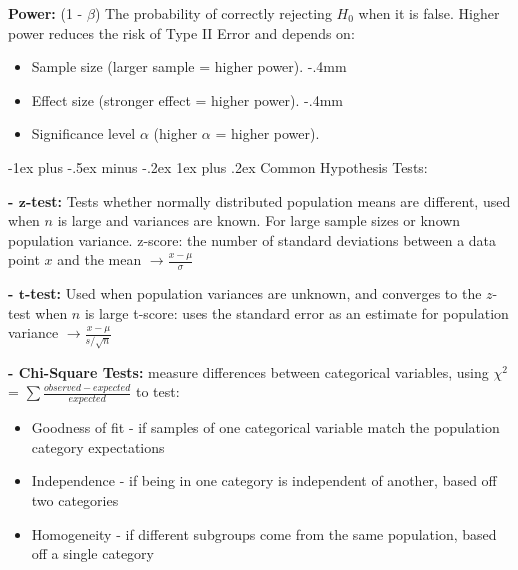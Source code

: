 \documentclass[10pt,landscape]{article}
\makeatletter
\renewcommand{\subsubsection}{\@startsection{subsubsection}{3}{0mm}%
                                {-1ex plus -.5ex minus -.2ex}%
                                {1ex plus .2ex}%
                                {\normalfont\small\bfseries}}
\makeatother
\begin{document}
\begin{multicols}{3}
\textbf{Power:} (1 - $\beta$) The probability of correctly rejecting $H_0$ when it is false. Higher power reduces the risk of Type II Error and depends on:
\begin{itemize}[label={--},leftmargin=4mm]
    \itemsep -.8mm
    \item Sample size (larger sample = higher power).
    \itemsep -.4mm
    \item Effect size (stronger effect = higher power).
    \itemsep -.4mm
    \item Significance level $\alpha$ (higher $\alpha$ = higher power).
\end{itemize}

\subsubsection{Common Hypothesis Tests:}
\vspace{-.6mm}

\textbf{- $\boldsymbol{z}$-test:} Tests whether normally distributed population means are different, used when $n$ is large and variances are known. For large sample sizes or known population variance. 
\vspace{-.5mm}
\quad z-score: the number of standard deviations between a data point $x$ and the mean $\to \frac{x - \mu}{\sigma}$
\vspace{-.5mm}

\textbf{- $\boldsymbol{t}$-test:} Used when population variances are unknown, and converges to the $z$-test when $n$ is large
\vspace{-.5mm}
\quad t-score: uses the standard error as an estimate for population variance $\to \frac{x - \mu}{s/\sqrt{n}}$
\vspace{-.5mm}

\textbf{- Chi-Square Tests:} measure differences between categorical variables, using $\chi^2$ = $\sum \frac{observed - expected}{expected}$ to test:
\begin{itemize}[label={--},leftmargin=4mm]
    \itemsep -.4mm
    \item Goodness of fit - if samples of one categorical variable match the population category expectations
    \item Independence -  if being in one category is independent of another, based off two categories
    \item Homogeneity - if different subgroups come from the same population, based off a single category
\end{itemize}


\end{multicols}
\end{document}
